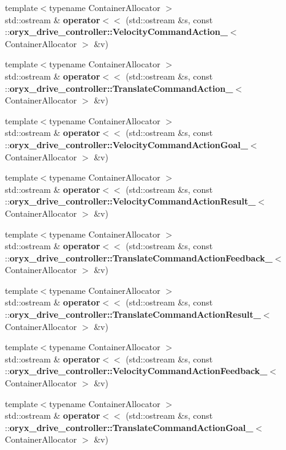 \begin{DoxyCompactItemize}
\item 
{\footnotesize template$<$typename Container\-Allocator $>$ }\\std\-::ostream \& {\bf operator$<$$<$} (std\-::ostream \&s, const \-::{\bf oryx\-\_\-drive\-\_\-controller\-::\-Velocity\-Command\-Action\-\_\-}$<$ \-Container\-Allocator $>$ \&v)
\item 
{\footnotesize template$<$typename Container\-Allocator $>$ }\\std\-::ostream \& {\bf operator$<$$<$} (std\-::ostream \&s, const \-::{\bf oryx\-\_\-drive\-\_\-controller\-::\-Translate\-Command\-Action\-\_\-}$<$ \-Container\-Allocator $>$ \&v)
\item 
{\footnotesize template$<$typename Container\-Allocator $>$ }\\std\-::ostream \& {\bf operator$<$$<$} (std\-::ostream \&s, const \-::{\bf oryx\-\_\-drive\-\_\-controller\-::\-Velocity\-Command\-Action\-Goal\-\_\-}$<$ \-Container\-Allocator $>$ \&v)
\item 
{\footnotesize template$<$typename Container\-Allocator $>$ }\\std\-::ostream \& {\bf operator$<$$<$} (std\-::ostream \&s, const \-::{\bf oryx\-\_\-drive\-\_\-controller\-::\-Velocity\-Command\-Action\-Result\-\_\-}$<$ \-Container\-Allocator $>$ \&v)
\item 
{\footnotesize template$<$typename Container\-Allocator $>$ }\\std\-::ostream \& {\bf operator$<$$<$} (std\-::ostream \&s, const \-::{\bf oryx\-\_\-drive\-\_\-controller\-::\-Translate\-Command\-Action\-Feedback\-\_\-}$<$ \-Container\-Allocator $>$ \&v)
\item 
{\footnotesize template$<$typename Container\-Allocator $>$ }\\std\-::ostream \& {\bf operator$<$$<$} (std\-::ostream \&s, const \-::{\bf oryx\-\_\-drive\-\_\-controller\-::\-Translate\-Command\-Action\-Result\-\_\-}$<$ \-Container\-Allocator $>$ \&v)
\item 
{\footnotesize template$<$typename Container\-Allocator $>$ }\\std\-::ostream \& {\bf operator$<$$<$} (std\-::ostream \&s, const \-::{\bf oryx\-\_\-drive\-\_\-controller\-::\-Velocity\-Command\-Action\-Feedback\-\_\-}$<$ \-Container\-Allocator $>$ \&v)
\item 
{\footnotesize template$<$typename Container\-Allocator $>$ }\\std\-::ostream \& {\bf operator$<$$<$} (std\-::ostream \&s, const \-::{\bf oryx\-\_\-drive\-\_\-controller\-::\-Translate\-Command\-Action\-Goal\-\_\-}$<$ \-Container\-Allocator $>$ \&v)
\end{DoxyCompactItemize}


